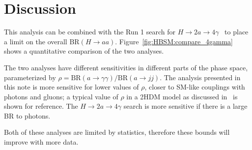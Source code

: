 \section{Discussion}
This analysis can be combined with the Run 1 search for $H\to 2a \to 4\gamma$~\cite{Aad:2015bua}
to place a limit on the overall BR$(H\rightarrow aa)$. 
Figure~\ref{fig:HBSM:compare_4gamma} shows a quantitative comparison of the two analyses.

The two analyses have different sensitivities in different parts of the phase space, 
parameterized by $\rho=\text{BR}(a\rightarrow \gamma\gamma)/\text{BR}(a\rightarrow jj)$. 
The analysis presented in this note is more sensitive for lower values of $\rho$, 
closer to SM-like couplings with photons and gluons; a typical value of $\rho$ in a 2HDM model as discussed in~\cite{Curtin:2013fra} is shown for reference.
The $H\to 2a \to 4\gamma$ search is more sensitive if there is a large BR to photons.
 
Both of these analyses are limited by statistics, 
therefore these bounds will improve with more data. 

